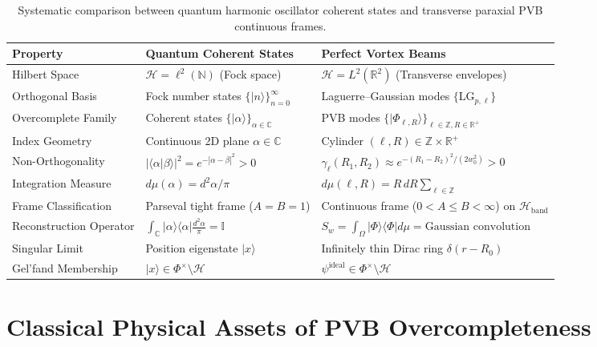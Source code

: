 \documentclass[11pt,a4paper]{article}
\begin{document}
\begin{table}[htbp]
\centering
\caption{Systematic comparison between quantum harmonic oscillator coherent states and transverse paraxial PVB continuous frames.}
\label{tab:coherent_states}
\small
\begin{tabular}{lll}
\toprule
\textbf{Property} & \textbf{Quantum Coherent States} & \textbf{Perfect Vortex Beams} \\
\midrule
Hilbert Space & $\mathcal{H} = \ell^2(\mathbb{N})$ (Fock space) & $\mathcal{H} = L^2(\mathbb{R}^2)$ (Transverse envelopes) \\
Orthogonal Basis & Fock number states $\{|n\rangle\}_{n=0}^\infty$ & Laguerre--Gaussian modes $\{\text{LG}_{p, \ell}\}$ \\
Overcomplete Family & Coherent states $\{|\alpha\rangle\}_{\alpha \in \mathbb{C}}$ & PVB modes $\{|\Phi_{\ell, R}\rangle\}_{\ell \in \mathbb{Z}, R \in \mathbb{R}^+}$ \\
Index Geometry & Continuous 2D plane $\alpha \in \mathbb{C}$ & Cylinder $(\ell, R) \in \mathbb{Z} \times \mathbb{R}^+$ \\
Non-Orthogonality & $|\langle \alpha | \beta \rangle|^2 = e^{-|\alpha - \beta|^2} > 0$ & $\gamma_\ell(R_1, R_2) \approx e^{-(R_1 - R_2)^2 / (2w_0^2)} > 0$ \\
Integration Measure & $d\mu(\alpha) = d^2\alpha / \pi$ & $d\mu(\ell, R) = R \, dR \sum_{\ell \in \mathbb{Z}}$ \\
Frame Classification & Parseval tight frame ($A=B=1$) & Continuous frame ($0 < A \le B < \infty$) on $\mathcal{H}_{\text{band}}$ \\
Reconstruction Operator & $\int_\mathbb{C} |\alpha\rangle \langle \alpha| \frac{d^2\alpha}{\pi} = \mathbb{I}$ & $S_w = \int_\Omega |\Phi\rangle \langle \Phi| d\mu = \text{Gaussian convolution}$ \\
Singular Limit & Position eigenstate $|x\rangle$ & Infinitely thin Dirac ring $\delta(r - R_0)$ \\
Gel'fand Membership & $|x\rangle \in \Phi^\times \setminus \mathcal{H}$ & $\psi^{\text{ideal}} \in \Phi^\times \setminus \mathcal{H}$ \\
\bottomrule
\end{tabular}
\end{table}

\section{Classical Physical Assets of PVB Overcompleteness}
\label{sec:classical_assets}
\end{document}

